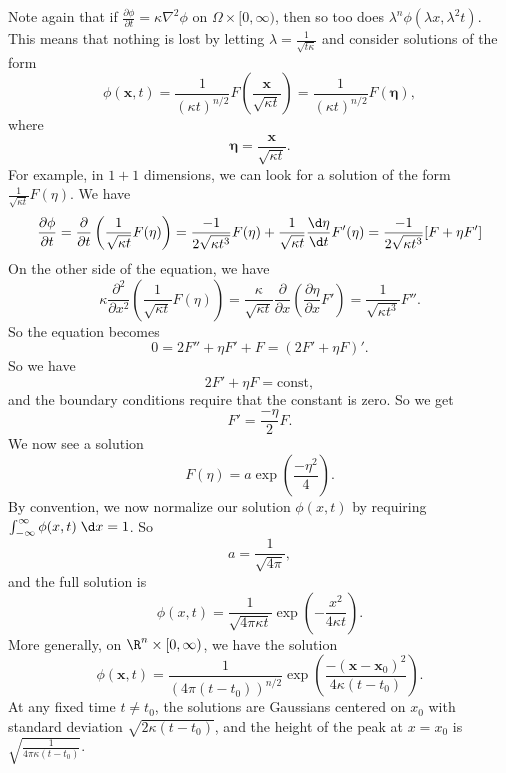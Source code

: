 \documentclass[a4paper]{article}
\begin{document}
Note again that if $\frac{\partial\phi}{\partial t} = \kappa \nabla^2 \phi$ on $\Omega\times [0, \infty)$, then so too does $\lambda^n \phi(\lambda x, \lambda^2 t)$. This means that nothing is lost by letting $\lambda = \frac{1}{\sqrt{t \kappa}}$ and consider solutions of the form %
\[
  \phi(\mathbf{x}, t) = \frac{1}{(\kappa t)^{n/2}} F\left(\frac{\mathbf{x}}{\sqrt{\kappa t}}\right) = \frac{1}{(\kappa t)^{n/2}}F(\boldsymbol\eta),
\]
where
\[
  \boldsymbol\eta = \frac{\mathbf{x}}{\sqrt{\kappa t}}.
\]
For example, in $1 + 1$ dimensions, we can look for a solution of the form $\frac{1}{\sqrt{\kappa t}} F(\eta)$. We have
\[
  \frac{\partial\phi}{\partial t} = \frac{\partial}{\partial t}\left(\frac{1}{\sqrt{\kappa t}} F(\eta)\right) = \frac{-1}{2\sqrt{\kappa t^3}} F(\eta) + \frac{1}{\sqrt{\kappa t}} \frac{\d \eta}{\d t}F'(\eta) = \frac{-1}{2\sqrt{\kappa t^3}}[F + \eta F']
\]
On the other side of the equation, we have
\[
  \kappa\frac{\partial^2}{\partial x^2} \left(\frac{1}{\sqrt{\kappa t}} F(\eta)\right) = \frac{\kappa}{\sqrt{\kappa t}} \frac{\partial}{\partial x}\left(\frac{\partial \eta}{\partial x} F'\right) = \frac{1}{\sqrt{\kappa t^3}}F''.
\]
So the equation becomes
\[
  0 = 2F'' + \eta F' + F = (2F' + \eta F)'.
\]
So we have
\[
  2F' + \eta F = \text{const},
\]
and the boundary conditions require that the constant is zero. So we get
\[
  F' = \frac{-\eta}{2}F.
\]
We now see a solution
\[
  F(\eta) = a \exp\left(\frac{-\eta^2}{4}\right).
\]
By convention, we now normalize our solution $\phi(x, t)$ by requiring $\int_{-\infty}^\infty \phi(x, t)\;\d x = 1$. So
\[
  a = \frac{1}{\sqrt{4\pi}},
\]
and the full solution is
\[
  \phi(x, t) = \frac{1}{\sqrt{4\pi \kappa t}}\exp\left(- \frac{x^2}{4\kappa t}\right).
\]
More generally, on $\R^n \times [0, \infty)$, we have the solution
\[
  \phi(\mathbf{x}, t) = \frac{1}{(4\pi (t - t_0))^{n/2}} \exp\left(\frac{-(\mathbf{x} - \mathbf{x}_0)^2}{4\kappa(t - t_0)}\right).
\]
At any fixed time $t\not= t_0$, the solutions are Gaussians centered on $x_0$ with standard deviation $\sqrt{2\kappa (t - t_0)}$, and the height of the peak at $x = x_0$ is $\sqrt{\frac{1}{4\pi \kappa (t - t_0)}}$.
\end{document}
